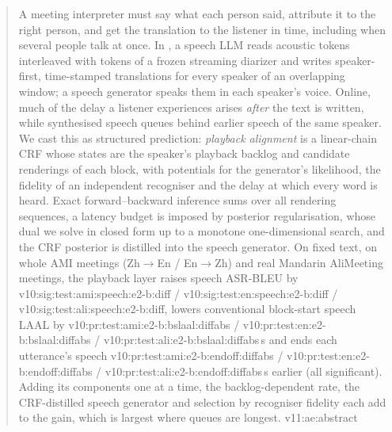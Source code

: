 \begin{abstract}
A meeting interpreter must say what each person said, attribute it to the right person, and get the translation to the
listener in time, including when several people talk at once. In \sys{}, a speech LLM reads acoustic tokens interleaved
with tokens of a frozen streaming diarizer and writes speaker-first, time-stamped translations for every speaker of an
overlapping window; a speech generator speaks them in each speaker's voice. Online, much of the delay a listener
experiences arises \emph{after} the text is written, while synthesised speech queues behind earlier speech of the same
speaker. We cast this as structured prediction: \emph{playback alignment} is a linear-chain CRF whose states are the
speaker's playback backlog and candidate renderings of each block, with potentials for the generator's likelihood, the
fidelity of an independent recogniser and the delay at which every word is heard. Exact forward--backward inference
sums over all rendering sequences, a latency budget is imposed by posterior regularisation, whose dual we solve in
closed form up to a monotone one-dimensional search, and the CRF posterior is distilled into the speech generator. On
fixed text, on whole AMI meetings (Zh$\rightarrow$En / En$\rightarrow$Zh) and real Mandarin AliMeeting meetings, the
playback layer raises speech ASR-BLEU by \num{v10:sig:test:ami:speech:e2-b:diff} /
\num{v10:sig:test:en:speech:e2-b:diff} / \num{v10:sig:test:ali:speech:e2-b:diff}, lowers conventional block-start
speech LAAL by \num{v10:pr:test:ami:e2-b:bslaal:diffabs} / \num{v10:pr:test:en:e2-b:bslaal:diffabs} /
\num{v10:pr:test:ali:e2-b:bslaal:diffabs}\,s and ends each utterance's speech
\num{v10:pr:test:ami:e2-b:endoff:diffabs} / \num{v10:pr:test:en:e2-b:endoff:diffabs} /
\num{v10:pr:test:ali:e2-b:endoff:diffabs}\,s earlier (all significant). Adding its components one at a time, the backlog-dependent rate, the
CRF-distilled speech generator and selection by recogniser fidelity each add to the gain, which is largest where queues
are longest.\ifAliEval{} \num{v11:ae:abstract}\fi
\end{abstract}
